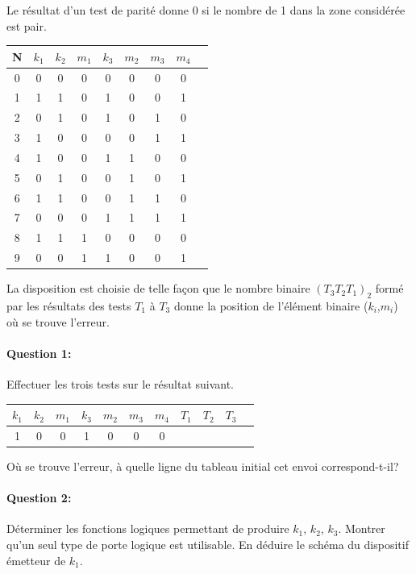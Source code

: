 Le résultat d'un test de parité donne 0 si le nombre de 1 dans la zone considérée est pair.

\begin{center}
\begin{tabular}{|c|c|c|c|c|c|c|c|c|}
\hline
N  & $k_1$ & $k_2$ & $m_1$ & $k_3$ & $m_2$ & $m_3$ & $m_4$ \\
\hline
0 & 0 & 0 & 0 & 0 & 0 & 0 & 0 \\
\hline
1 & 1 & 1 & 0 & 1 & 0 & 0 & 1 \\
\hline
2 & 0 & 1 & 0 & 1 & 0 & 1 & 0 \\
\hline
3 & 1 & 0 & 0 & 0 & 0 & 1 & 1 \\
\hline
4 & 1 & 0 & 0 & 1 & 1 & 0 & 0 \\
\hline
5 & 0 & 1 & 0 & 0 & 1 & 0 & 1 \\
\hline
6 & 1 & 1 & 0 & 0 & 1 & 1 & 0 \\
\hline
7 & 0 & 0 & 0 & 1 & 1 & 1 & 1 \\
\hline
8 & 1 & 1 & 1 & 0 & 0 & 0 & 0 \\
\hline
9 & 0 & 0 & 1 & 1 & 0 & 0 & 1 \\
\hline
\end{tabular} 
\end{center}

La disposition est choisie de telle façon que le nombre binaire $(T_3T_2T_1)_2$ formé par les résultats des tests $T_1$ à $T_3$ donne la position de l'élément binaire ($k_i$,$m_i$) où se trouve l'erreur.

\paragraph{Question 1:} Effectuer les trois tests sur le résultat suivant.

\begin{center}
\begin{tabular}{|c|c|c|c|c|c|c|c|c|c|c|}
\hline
$k_1$ & $k_2$ & $m_1$ & $k_3$ & $m_2$ & $m_3$ & $m_4$ & $T_1$ & $T_2$ & $T_3$\\
\hline
1 & 0 & 0 & 1 & 0 & 0 & 0 & & & \\
\hline
\end{tabular} 
\end{center}

Où se trouve l'erreur, à quelle ligne du tableau initial cet envoi correspond-t-il?

\paragraph{Question 2:} Déterminer les fonctions logiques permettant de produire $k_1$, $k_2$, $k_3$. Montrer qu'un seul type de porte logique est utilisable. En déduire le schéma du dispositif émetteur de $k_1$.

